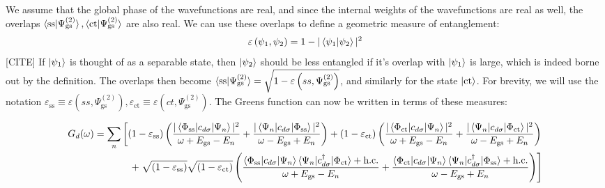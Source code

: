 \documentclass[reprint,superscriptaddress,floatfix]{revtex4-2}
\begin{document}
We assume that the global phase of the wavefunctions are real, and since the internal weights of the wavefunctions are real as well, the overlaps \(\braket{\text{ss}|\Psi^{(2)}_\text{gs}},\braket{\text{ct}|\Psi^{(2)}_\text{gs}}\) are also real. We can use these overlaps to define a geometric measure of entanglement:
\begin{equation}\begin{aligned}
	\varepsilon\left(\psi_1,\psi_2\right) = 1 - |\braket{\psi_1 | \psi_2}|^2
\end{aligned}\end{equation}
[CITE]
If \(\ket{\psi_1}\) is thought of as a separable state, then \(\ket{\psi_2}\) should be less entangled if it's overlap with \(\ket{\psi_1}\) is large, which is indeed borne out by the definition.
The overlaps then become \(\braket{\text{ss}|\Psi^{(2)}_\text{gs}} = \sqrt{1 - \varepsilon\left(ss,\Psi^{(2)}_\text{gs}\right)}\), and similarly for the state \(\ket{\text{ct}}\). For brevity, we will use the notation \(\varepsilon_\text{ss} \equiv \varepsilon\left(ss,\Psi^{(2)}_\text{gs}\right), \varepsilon_\text{ct} \equiv \varepsilon\left(ct,\Psi^{(2)}_\text{gs}\right)\). The Greens function can now be written in terms of these measures:
\begin{widetext}
\begin{equation}\begin{aligned}
	G_d(\omega) = \sum_n \left[\left(1 - \varepsilon_\text{ss} \right) \left(\frac{|\braket{\Phi_\text{ss} | c_{d\sigma} | \Psi_n}|^2}{\omega + E_\text{gs} - E_n} + \frac{|\braket{\Psi_n | c_{d\sigma} | \Phi_\text{ss}}|^2}{\omega - E_\text{gs} + E_n}\right) + \left(1 - \varepsilon_\text{ct} \right) \left(\frac{|\braket{\Phi_\text{ct} | c_{d\sigma} | \Psi_n}|^2}{\omega + E_\text{gs} - E_n} + \frac{|\braket{\Psi_n | c_{d\sigma} | \Phi_\text{ct}}|^2}{\omega - E_\text{gs} + E_n}\right)\right.\\
	+ \left. \sqrt{\left(1 - \varepsilon_\text{ss} \right)}\sqrt{\left(1 - \varepsilon_\text{ct} \right)} \left(\frac{\braket{\Phi_\text{ss} | c_{d\sigma} | \Psi_n}\braket{\Psi_n | c^\dagger_{d\sigma} | \Phi_\text{ct}} + \text{h.c.}}{\omega + E_\text{gs} - E_n} + \frac{\braket{\Phi_\text{ct} | c_{d\sigma} | \Psi_n}\braket{\Psi_n | c^\dagger_{d\sigma} | \Phi_\text{ss}} + \text{h.c.}}{\omega - E_\text{gs} + E_n}\right)\right]
\end{aligned}\end{equation}
\end{widetext}
\end{document}
